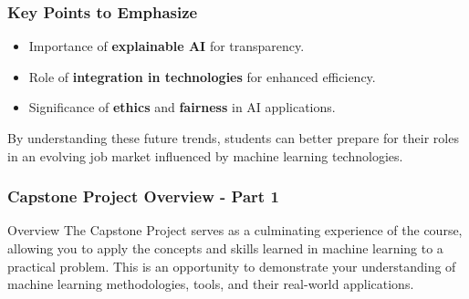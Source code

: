 \documentclass[aspectratio=169]{beamer}
\begin{document}
\begin{frame}[fragile]
    \frametitle{Key Points to Emphasize}
    \begin{itemize}
        \item Importance of \textbf{explainable AI} for transparency.
        \item Role of \textbf{integration in technologies} for enhanced efficiency.
        \item Significance of \textbf{ethics} and \textbf{fairness} in AI applications.
    \end{itemize}
    By understanding these future trends, students can better prepare for their roles in an evolving job market influenced by machine learning technologies.
\end{frame}

\begin{frame}[fragile]
    \frametitle{Capstone Project Overview - Part 1}
    \begin{block}{Overview}
        The Capstone Project serves as a culminating experience of the course, allowing you to apply the concepts and skills learned in machine learning to a practical problem. 
        This is an opportunity to demonstrate your understanding of machine learning methodologies, tools, and their real-world applications.
    \end{block}
\end{frame}
\end{document}
